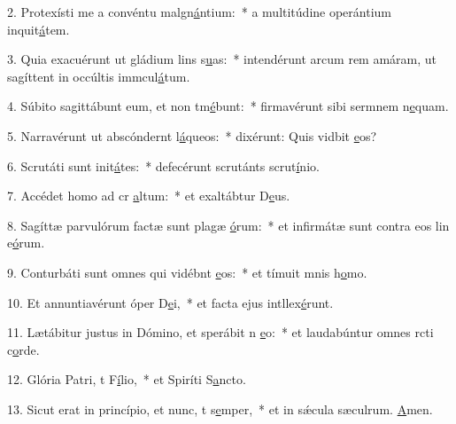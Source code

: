 2. Protexísti me a convéntu malgn\uline{á}ntium:~* a multitúdine operántium inquit\uline{á}tem.\par 
3. Quia exacuérunt ut gládium lins s\uline{u}as:~* intendérunt arcum rem amáram, ut sagíttent in occúltis immcul\uline{á}tum.\par 
4. Súbito sagittábunt eum, et non tm\uline{é}bunt:~* firmavérunt sibi sermnem n\uline{e}quam.\par 
5. Narravérunt ut abscóndernt l\uline{á}queos:~* dixérunt: Quis vidbit \uline{e}os?\par 
6. Scrutáti sunt init\uline{á}tes:~* defecérunt scrutánts scrut\uline{í}nio.\par 
7. Accédet homo ad cr \uline{a}ltum:~* et exaltábtur D\uline{e}us.\par 
8. Sagíttæ parvulórum factæ sunt plagæ \uline{ó}rum:~* et infirmátæ sunt contra eos lin e\uline{ó}rum.\par 
9. Conturbáti sunt omnes qui vidébnt \uline{e}os:~* et tímuit mnis h\uline{o}mo.\par 
10. Et annuntiavérunt óper D\uline{e}i,~* et facta ejus intllex\uline{é}runt.\par 
11. Lætábitur justus in Dómino, et sperábit n \uline{e}o:~* et laudabúntur omnes rcti c\uline{o}rde.\par 
12. Glória Patri, t F\uline{í}lio,~* et Spiríti S\uline{a}ncto.\par 
13. Sicut erat in princípio, et nunc, t s\uline{e}mper,~* et in sǽcula sæculrum. \uline{A}men.\par 
